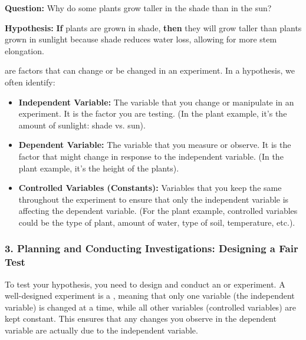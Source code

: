 \begin{example}
\textbf{Question:} Why do some plants grow taller in the shade than in the sun?

\textbf{Hypothesis:} \textbf{If} plants are grown in shade, \textbf{then} they will grow taller than plants grown in sunlight because shade reduces water loss, allowing for more stem elongation.


 are factors that can change or be changed in an experiment. In a hypothesis, we often identify:
\begin{itemize}
    \item \textbf{Independent Variable:} The variable that you change or manipulate in an experiment. It is the factor you are testing.  (In the plant example, it’s the amount of sunlight: shade vs. sun).
    \item \textbf{Dependent Variable:} The variable that you measure or observe. It is the factor that might change in response to the independent variable. (In the plant example, it’s the height of the plants).
    \item \textbf{Controlled Variables (Constants):}  Variables that you keep the same throughout the experiment to ensure that only the independent variable is affecting the dependent variable. (For the plant example, controlled variables could be the type of plant, amount of water, type of soil, temperature, etc.).
\end{itemize}

\subsubsection{3. Planning and Conducting Investigations: Designing a Fair Test}

To test your hypothesis, you need to design and conduct an  or experiment. A well-designed experiment is a , meaning that only one variable (the independent variable) is changed at a time, while all other variables (controlled variables) are kept constant.  This ensures that any changes you observe in the dependent variable are actually due to the independent variable.


\end{example}
